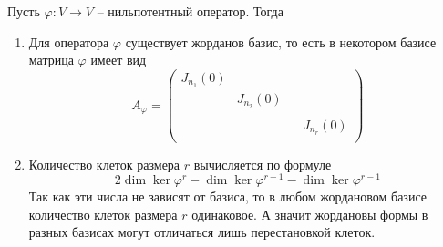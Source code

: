 \begin{claim}
\label{claim::NilJNF}
Пусть $\varphi\colon V\to V$ -- нильпотентный оператор.
Тогда
\begin{enumerate}
\item Для оператора $\varphi$ существует жорданов базис, то есть в некотором базисе матрица $\varphi$ имеет вид
\[
A_\varphi = 
\begin{pmatrix}
{J_{n_1}(0)}&{}&{}&{}\\
{}&{J_{n_2}(0)}&{}&{}\\
{}&{}&{}&{}\\
{}&{}&{}&{J_{n_r}(0)}\\
\end{pmatrix}
\]

\item Количество клеток размера $r$ вычисляется по формуле
\[
2\dim \ker \varphi^r - \dim \ker \varphi^{r+1} - \dim \ker \varphi^{r-1}
\]
Так как эти числа не зависят от базиса, то в любом жордановом базисе количество клеток размера $r$ одинаковое.
А значит жордановы формы в разных базисах могут отличаться лишь перестановкой клеток.
\end{enumerate}
\end{claim}
